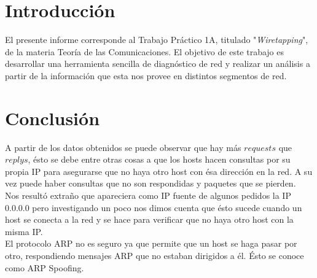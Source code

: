 \documentclass{article}
\begin{document}





\maketitle


\section{Introducción}
El presente informe corresponde al Trabajo Práctico 1A, titulado
"\emph{Wiretapping}", de la materia Teoría de las Comunicaciones. El objetivo
de este trabajo es desarrollar una herramienta sencilla de diagnóstico de red
y realizar un análisis a partir de la información que esta nos provee en
distintos segmentos de red.

\newpage


\section{Conclusión}
A partir de los datos obtenidos se puede observar que hay más $requests$ que $replys$, ésto se debe entre otras cosas a que los hosts hacen consultas por su propia IP para asegurarse que no haya otro host con ésa dirección en la red. A su vez puede haber consultas que no son respondidas y paquetes que se pierden.\\
Nos resultó extraño que apareciera como IP fuente de algunos pedidos la IP 0.0.0.0 pero investigando un poco nos dimos cuenta que ésto sucede cuando un host se conecta a la red y se hace para verificar que no haya otro host con la misma IP.\\
El protocolo ARP no es seguro ya que permite que un host se haga pasar por otro, respondiendo mensajes ARP que no estaban dirigidos a él. Ésto se conoce como ARP Spoofing.
\end{document}
